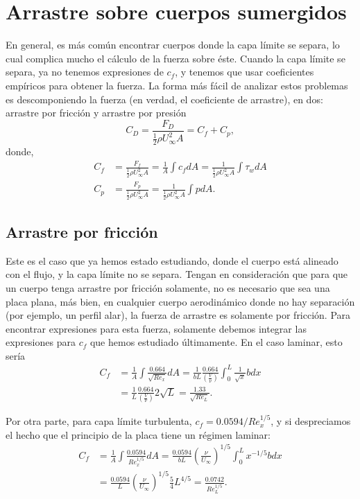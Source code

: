 \section*{Arrastre sobre cuerpos sumergidos}

En general, es más común encontrar cuerpos donde la capa límite se separa, lo cual complica mucho el cálculo de la fuerza sobre éste.
Cuando la capa límite se separa, ya no tenemos expresiones de $c_f$, y tenemos que usar coeficientes empíricos para obtener la fuerza.
La forma más fácil de analizar estos problemas es descomponiendo la fuerza (en verdad, el coeficiente de arrastre), en dos: arrastre por fricción y arrastre por presión
%
\begin{equation}
C_D = \frac{F_D}{\frac{1}{2}\rho U_\infty^2 A} = C_f + C_p,
\end{equation}
%
donde,
%
\begin{align}\label{eq:CfCp}
C_f & = \frac{F_f}{\frac{1}{2}\rho U_\infty^2 A}= \frac{1}{A}\int c_f dA = \frac{1}{\frac{1}{2}\rho U_\infty^2 A}\int\tau_wdA\nonumber\\
C_p & = \frac{F_p}{\frac{1}{2}\rho U_\infty^2 A}= \frac{1}{\frac{1}{2}\rho U_\infty^2 A}\int p dA.
\end{align}

\subsection*{Arrastre por fricción}
Este es el caso que ya hemos estado estudiando, donde el cuerpo está alineado con el flujo, y la capa límite no se separa.
Tengan en consideración que para que un cuerpo tenga arrastre por fricción solamente, no es necesario que sea una placa plana, más bien, en cualquier cuerpo aerodinámico donde no hay separación (por ejemplo, un perfil alar), la fuerza de arrastre es solamente por fricción.
Para encontrar expresiones para esta fuerza, solamente debemos integrar las expresiones para $c_f$ que hemos estudiado últimamente.
En el caso laminar, esto sería
%
\begin{align}
C_f &= \frac{1}{A}\int\frac{0.664}{\sqrt{Re_x}}dA = \frac{1}{bL} \frac{0.664}{\left(\frac{V}{\nu}\right)}\int_0^L \frac{1}{\sqrt{x}} b dx \nonumber\\
&= \frac{1}{L} \frac{0.664}{\left(\frac{V}{\nu}\right)} 2\sqrt{L} = \frac{1.33}{\sqrt{Re_L}}.
\end{align}

Por otra parte, para capa límite turbulenta, $c_f=0.0594/Re_x^{1/5}$, y si despreciamos el hecho que el principio de la placa tiene un régimen laminar:
%
\begin{align}\label{eq:Cf_turb}
C_f &= \frac{1}{A}\int\frac{0.0594}{Re_x^{1/5}}dA = \frac{0.0594}{bL}\left(\frac{\nu}{U_\infty}\right)^{1/5}\int_0^Lx^{-1/5}bdx \nonumber\\
&=\frac{0.0594}{L}\left(\frac{\nu}{U_\infty}\right)^{1/5}\frac{5}{4}L^{4/5} = \frac{0.0742}{Re_L^{1/5}}.
\end{align}

